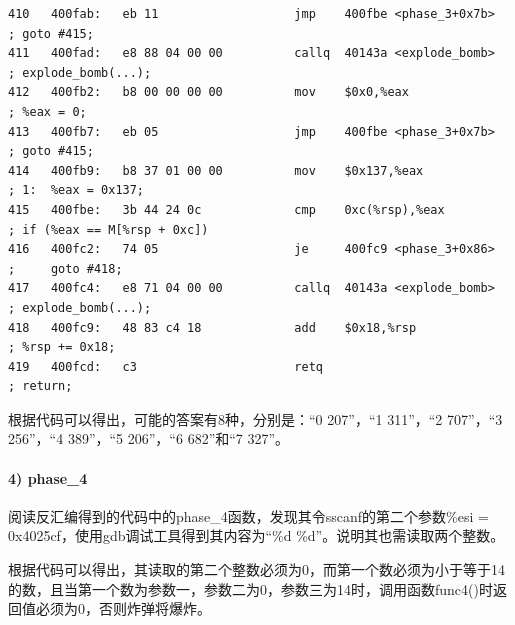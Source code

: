 \documentclass{article}
\begin{document}
\begin{lstlisting}[title = phase\_3反汇编代码及注释, xleftmargin = 2em,xrightmargin = 2em, aboveskip = 1em, numbers = none, basicstyle=\footnotesize\ttfamily]
410   400fab:   eb 11                   jmp    400fbe <phase_3+0x7b>        ; goto #415;                       
411   400fad:   e8 88 04 00 00          callq  40143a <explode_bomb>        ; explode_bomb(...);
412   400fb2:   b8 00 00 00 00          mov    $0x0,%eax                    ; %eax = 0;
413   400fb7:   eb 05                   jmp    400fbe <phase_3+0x7b>        ; goto #415;
414   400fb9:   b8 37 01 00 00          mov    $0x137,%eax              ; 1:  %eax = 0x137;
415   400fbe:   3b 44 24 0c             cmp    0xc(%rsp),%eax               ; if (%eax == M[%rsp + 0xc])
416   400fc2:   74 05                   je     400fc9 <phase_3+0x86>        ;     goto #418;
417   400fc4:   e8 71 04 00 00          callq  40143a <explode_bomb>        ; explode_bomb(...);
418   400fc9:   48 83 c4 18             add    $0x18,%rsp                   ; %rsp += 0x18;
419   400fcd:   c3                      retq                                ; return;
\end{lstlisting}

根据代码可以得出，可能的答案有8种，分别是：“0 207”，“1 311”，“2 707”，“3 256”，“4 389”，“5 206”，“6 682”和“7 327”。

\paragraph{4) phase\_4}

阅读反汇编得到的代码中的phase\_4函数，发现其令sscanf的第二个参数\%esi = 0x4025cf，使用gdb调试工具得到其内容为“\%d \%d”。说明其也需读取两个整数。

根据代码可以得出，其读取的第二个整数必须为0，而第一个数必须为小于等于14的数，且当第一个数为参数一，参数二为0，参数三为14时，调用函数func4()时返回值必须为0，否则炸弹将爆炸。
\end{document}

